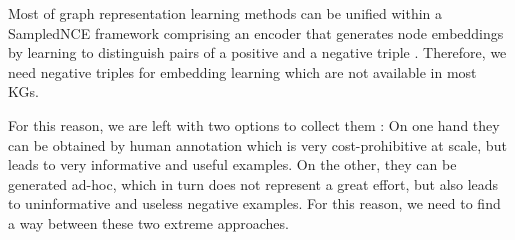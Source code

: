 Most of graph representation learning methods can be unified within a \ac{SampledNCE} framework comprising an encoder that generates node embeddings by learning to distinguish pairs of a positive and a negative triple \cite{MCNS}.
Therefore, we need negative triples for embedding learning which are not available in most \acp{KG}. 

For this reason, we are left with two options to collect them \cite{safavi2021negater}: 
On one hand they can be obtained by human annotation which is very cost-prohibitive at scale, but leads to very informative and useful examples. 
On the other, they can be generated ad-hoc, which in turn does not represent a great effort, but also leads to uninformative and useless negative examples.
For this reason, we need to find a way between these two extreme approaches.






